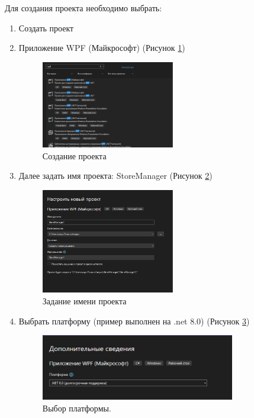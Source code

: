 \documentclass[12pt]{article}
\renewcommand{\texttt}[1]{{\small\ttfamily #1}}
\numberwithin{listing}{section}
\numberwithin{figure}{section}
\begin{document}
Для создания проекта необходимо выбрать:
\begin{enumerate}
	\item Создать проект
	\item Приложение \texttt{WPF} (Майкрософт) (Рисунок \ref{fig:projectcreate})

	      \begin{figure}[H]
		      \centering
		      \includegraphics[width=0.55\textwidth]{fig/image 2.png}
		      \caption{Создание проекта}
		      \label{fig:projectcreate}
	      \end{figure}

	\item Далее задать имя проекта: \texttt{StoreManager} (Рисунок \ref{fig:createnameproject})

	      \begin{figure}[H]
		      \centering
		      \includegraphics[width=0.55\textwidth]{fig/image 3.png}
		      \caption{Задание имени проекта}
		      \label{fig:createnameproject}
	      \end{figure}

	      \newpage

	\item Выбрать платформу (пример выполнен на .net 8.0) (Рисунок \ref{fig:net8})

	      \begin{figure}[H]
		      \centering
		      \includegraphics[width=0.8\textwidth]{fig/image 4.png}
		      \caption{Выбор платформы.}
		      \label{fig:net8}
	      \end{figure}

\end{enumerate}
\end{document}
